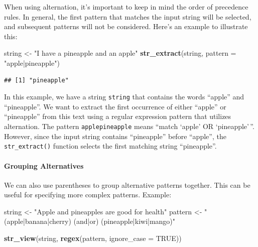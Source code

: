 \documentclass[
]{book}
\newenvironment{Shaded}{\begin{snugshade}}{\end{snugshade}}
\newcommand{\AttributeTok}[1]{\textcolor[rgb]{0.13,0.29,0.53}{#1}}
\newcommand{\ConstantTok}[1]{\textcolor[rgb]{0.56,0.35,0.01}{#1}}
\newcommand{\FunctionTok}[1]{\textcolor[rgb]{0.13,0.29,0.53}{\textbf{#1}}}
\newcommand{\NormalTok}[1]{#1}
\newcommand{\OtherTok}[1]{\textcolor[rgb]{0.56,0.35,0.01}{#1}}
\newcommand{\StringTok}[1]{\textcolor[rgb]{0.31,0.60,0.02}{#1}}
\begin{document}
When using alternation, it's important to keep in mind the order of precedence rules. In general, the first pattern that matches the input string will be selected, and subsequent patterns will not be considered. Here's an example to illustrate this:

\begin{Shaded}
\begin{Highlighting}[]
\NormalTok{string }\OtherTok{\textless{}{-}} \StringTok{"I have a pineapple and an apple"}
\FunctionTok{str\_extract}\NormalTok{(string, }\AttributeTok{pattern =} \StringTok{"apple|pineapple"}\NormalTok{)}
\end{Highlighting}
\end{Shaded}

\begin{verbatim}
## [1] "pineapple"
\end{verbatim}

In this example, we have a string \texttt{string} that contains the words ``apple'' and ``pineapple''. We want to extract the first occurrence of either ``apple'' or ``pineapple'' from this text using a regular expression pattern that utilizes alternation. The pattern \texttt{apple\textbar{}pineapple} means ``match `apple' OR `pineapple'\,''. However, since the input string contains ``pineapple'' before ``apple'', the \texttt{str\_extract()} function selects the first matching string ``pineapple''.

\hypertarget{grouping-alternatives}{%
\paragraph{Grouping Alternatives}\label{grouping-alternatives}}

We can also use parentheses to group alternative patterns together. This can be useful for specifying more complex patterns. Example:

\begin{Shaded}
\begin{Highlighting}[]
\NormalTok{string }\OtherTok{\textless{}{-}} \StringTok{"Apple and pineapples are good for health"}
\NormalTok{pattern }\OtherTok{\textless{}{-}} \StringTok{"(apple|banana|cherry) (and|or) (pineapple|kiwi|mango)"}

\FunctionTok{str\_view}\NormalTok{(string, }\FunctionTok{regex}\NormalTok{(pattern, }\AttributeTok{ignore\_case =} \ConstantTok{TRUE}\NormalTok{))}
\end{Highlighting}
\end{Shaded}
\end{document}
